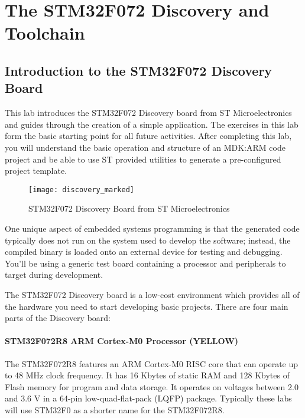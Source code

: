 \documentclass[11pt,fleqn]{book} %
\begin{document}
	


\tableofcontents
\chapter{The STM32F072 Discovery and Toolchain}
\section{Introduction to the STM32F072 Discovery Board}
This lab introduces the STM32F072 Discovery board from ST Microelectronics and guides through the creation of a simple application. The exercises in this lab form the basic starting point for all future activities. After completing this lab, you will understand the basic operation and structure of an MDK:ARM code project and be able to use ST provided utilities to generate a pre-configured project template. 

\begin{figure}[h]
	\centering\texttt{[image: discovery\_marked]}
	\caption{STM32F072 Discovery Board from ST Microelectronics}
\end{figure}

One unique aspect of embedded systems programming is that the generated code typically does not run on the system used to develop the software; instead, the compiled binary is loaded onto an external device for testing and debugging. You'll be using a generic test board containing a processor and peripherals to target during development. 

The STM32F072 Discovery board is a low-cost environment which provides all of the hardware you need to start developing basic projects. There are four main parts of the Discovery board: 

\subsubsection*{STM32F072R8 ARM Cortex-M0 Processor ({\color{yellow!80!black}YELLOW})}
The STM32F072R8 features an ARM Cortex-M0 RISC core that can operate up to 48 MHz clock frequency. It has 16 Kbytes of static RAM and 128 Kbytes of Flash memory for program and data storage. It operates on voltages between 2.0 and 3.6 V in a 64-pin low-quad-flat-pack (LQFP) package. Typically these labs will use STM32F0 as a shorter name for the STM32F072R8.
\end{document}
